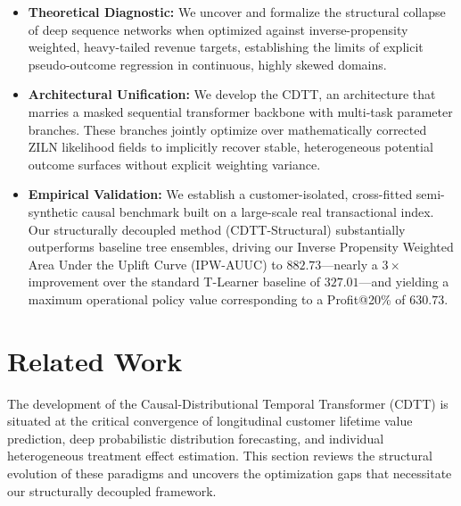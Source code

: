 \documentclass[10pt, conference]{IEEEtran}
\newcommand{\ourmodel}{CDTT}
\begin{document}
\begin{itemize}
    \item \textbf{Theoretical Diagnostic:} We uncover and formalize the structural collapse of deep sequence networks when optimized against inverse-propensity weighted, heavy-tailed revenue targets, establishing the limits of explicit pseudo-outcome regression in continuous, highly skewed domains.
    \item \textbf{Architectural Unification:} We develop the CDTT, an architecture that marries a masked sequential transformer backbone with multi-task parameter branches. These branches jointly optimize over mathematically corrected ZILN likelihood fields to implicitly recover stable, heterogeneous potential outcome surfaces without explicit weighting variance.
    \item \textbf{Empirical Validation:} We establish a customer-isolated, cross-fitted semi-synthetic causal benchmark built on a large-scale real transactional index. Our structurally decoupled method (CDTT-Structural) substantially outperforms baseline tree ensembles, driving our Inverse Propensity Weighted Area Under the Uplift Curve (IPW-AUUC) to $882.73$---nearly a $3\times$ improvement over the standard T-Learner baseline of $327.01$---and yielding a maximum operational policy value corresponding to a Profit@20\% of $630.73$.
\end{itemize}
\section{Related Work}
\label{sec:related_work}

The development of the Causal-Distributional Temporal Transformer (\ourmodel) is situated at the critical convergence of longitudinal customer lifetime value prediction, deep probabilistic distribution forecasting, and individual heterogeneous treatment effect estimation. This section reviews the structural evolution of these paradigms and uncovers the optimization gaps that necessitate our structurally decoupled framework.
\end{document}

